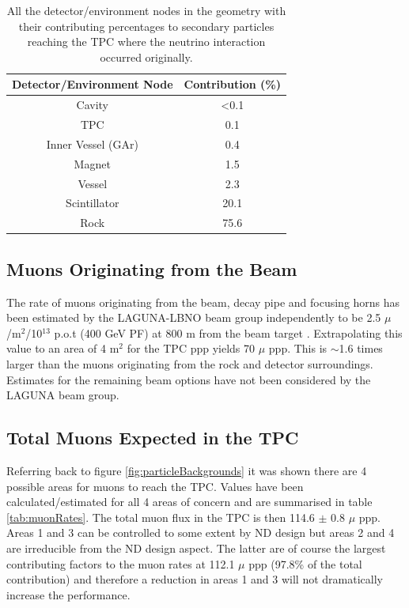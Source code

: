 \begin{table}[htbp]
\centering
\begin{tabular}{cc}
	\hline
	 \textbf{Detector/Environment Node} & \textbf{Contribution (\%)}\\
	 \hline
	 Cavity & <0.1\\
	TPC & 0.1\\
	Inner Vessel (GAr) & 0.4 \\
	Magnet & 1.5 \\
	Vessel & 2.3 \\
	Scintillator & 20.1\\
	Rock & 75.6 \\
	\hline
\end{tabular}
\caption{All the detector/environment nodes in the geometry with their contributing percentages to secondary particles reaching the TPC where the neutrino interaction occurred originally.}
\label{tab:backgroundInteractionNodes}
\end{table}

\subsection{Muons Originating from the Beam}
The rate of muons originating from the beam, decay pipe and focusing horns has been estimated by the LAGUNA-LBNO beam group independently to be 2.5 $\mu$/m$^{2}$/10$^{13}$ p.o.t (400 GeV PF) at 800 m from the beam target \cite{lbnoInternal}. Extrapolating this value to an area of 4 m$^{2}$ for the TPC ppp yields 70 $\mu$ ppp. This is $\sim$1.6 times larger than the muons originating from the rock and detector surroundings. Estimates for the remaining beam options have not been considered by the LAGUNA beam group.

\subsection{Total Muons Expected in the TPC}
Referring back to figure \ref{fig:particleBackgrounds} it was shown there are 4 possible areas for muons to reach the TPC. Values have been calculated/estimated for all 4 areas of concern and are summarised in table \ref{tab:muonRates}. The total muon flux in the TPC is then 114.6 $\pm$ 0.8 $\mu$ ppp. Areas 1 and 3 can be controlled to some extent by ND design but areas 2 and 4 are irreducible from the ND design aspect. The latter are of course the largest contributing factors to the muon rates at 112.1 $\mu$ ppp (97.8\% of the total contribution) and therefore a reduction in areas 1 and 3 will not dramatically increase the performance.

